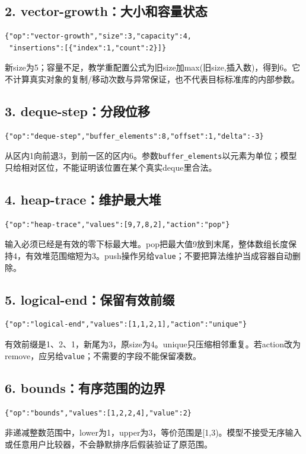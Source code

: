 \documentclass[11pt,a4paper,fontset=fandol]{ctexart}
\begin{document}
\subsection{2. vector-growth：大小和容量状态}
\begin{lstlisting}
{"op":"vector-growth","size":3,"capacity":4,
 "insertions":[{"index":1,"count":2}]}
\end{lstlisting}
新size为5；容量不足，教学重配置公式为旧size加max(旧size,插入数)，得到6。它不计算真实对象的复制/移动次数与异常保证，也不代表目标标准库的内部参数。

\subsection{3. deque-step：分段位移}
\begin{lstlisting}
{"op":"deque-step","buffer_elements":8,"offset":1,"delta":-3}
\end{lstlisting}
从区内1向前退3，到前一区的区内6。参数\texttt{buffer\_elements}以元素为单位；模型只给相对区位，不能证明该位置在某个真实deque里合法。

\subsection{4. heap-trace：维护最大堆}
\begin{lstlisting}
{"op":"heap-trace","values":[9,7,8,2],"action":"pop"}
\end{lstlisting}
输入必须已经是有效的零下标最大堆。pop把最大值9放到末尾，整体数组长度保持4，有效堆范围缩短为3。push操作另给\texttt{value}；不要把算法维护当成容器自动删除。

\subsection{5. logical-end：保留有效前缀}
\begin{lstlisting}
{"op":"logical-end","values":[1,1,2,1],"action":"unique"}
\end{lstlisting}
有效前缀是1、2、1，新尾为3，原size为4。unique只压缩相邻重复。若action改为remove，应另给\texttt{value}；不需要的字段不能保留凑数。

\subsection{6. bounds：有序范围的边界}
\begin{lstlisting}
{"op":"bounds","values":[1,2,2,4],"value":2}
\end{lstlisting}
非递减整数范围中，lower为1，upper为3，等价范围是[1,3)。模型不接受无序输入或任意用户比较器，不会静默排序后假装验证了原范围。
\end{document}
